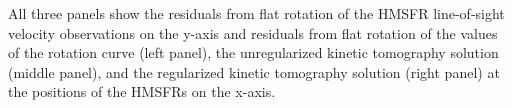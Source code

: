 \label{fig:maser_comparison} All three panels show the residuals from flat rotation of the \citet{2009ApJ...700..137R} HMSFR line-of-sight velocity observations on the y-axis and residuals from flat rotation of the values of the \citet{1985ApJ...295..422C} rotation curve (left panel), the unregularized kinetic tomography solution (middle panel), and the regularized kinetic tomography solution (right panel) at the positions of the HMSFRs on the x-axis. 
